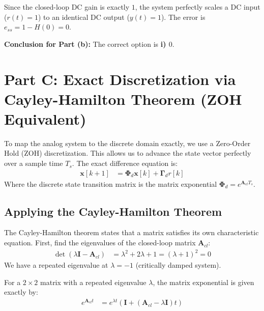\documentclass[journal,12pt,onecolumn]{IEEEtran}
\theoremstyle{remark}
\begin{document}
Since the closed-loop DC gain is exactly $1$, the system perfectly scales a DC input ($r(t) = 1$) to an identical DC output ($y(t) = 1$). 
The error is $e_{ss} = 1 - H(0) = 0$. 

\textbf{Conclusion for Part (b):} The correct option is \textbf{i) $0$}.


\section{Part C: Exact Discretization via Cayley-Hamilton Theorem (ZOH Equivalent)}

To map the analog system to the discrete domain exactly, we use a Zero-Order Hold (ZOH) discretization. This allows us to advance the state vector perfectly over a sample time $T_s$. The exact difference equation is:
\begin{align*}
\mathbf{x}[k+1] &= \mathbf{\Phi}_d \mathbf{x}[k] + \mathbf{\Gamma}_d r[k]
\end{align*}
Where the discrete state transition matrix is the matrix exponential $\mathbf{\Phi}_d = e^{\mathbf{A}_{cl}T_s}$. 

\subsection{Applying the Cayley-Hamilton Theorem}
The Cayley-Hamilton theorem states that a matrix satisfies its own characteristic equation. First, find the eigenvalues of the closed-loop matrix $\mathbf{A}_{cl}$:
\begin{align*}
\det(\lambda\mathbf{I} - \mathbf{A}_{cl}) &= \lambda^2 + 2\lambda + 1 = (\lambda + 1)^2 = 0
\end{align*}
We have a repeated eigenvalue at $\lambda = -1$ (critically damped system).

For a $2 \times 2$ matrix with a repeated eigenvalue $\lambda$, the matrix exponential is given exactly by:
\begin{align*}
e^{\mathbf{A}_{cl}t} &= e^{\lambda t} \left( \mathbf{I} + (\mathbf{A}_{cl} - \lambda\mathbf{I})t \right)
\end{align*}
\end{document}
